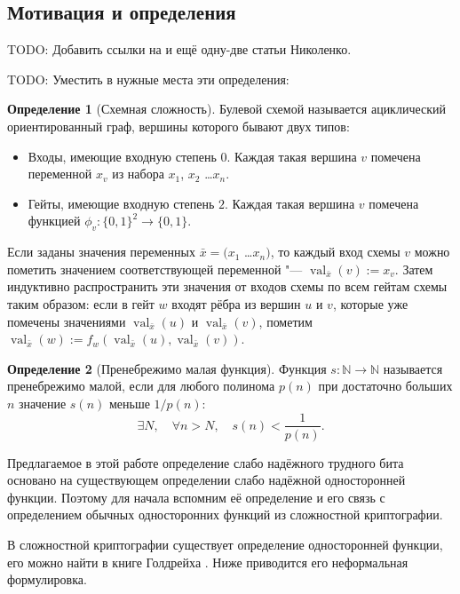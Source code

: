 \documentclass[oneside, a4paper]{article}
\theoremstyle{definition}
\newtheorem{definition}{Определение}
\theoremstyle{remark}
\DeclareMathOperator*{\val}{val}
\begin{document}
\subsection{Мотивация и определения}

TODO: Добавить ссылки на \cite{hirsch_milanich_nikolenko} и ещё одну-две статьи
Николенко.

TODO: Уместить в нужные места эти определения:

\begin{definition}[Схемная сложность]
Булевой схемой называется ациклический ориентированный граф, вершины которого
бывают двух типов:
\begin{itemize}
\item Входы, имеющие входную степень $0$. Каждая такая вершина $v$ помечена
  переменной $x_v$ из набора $x_1$, $x_2$ \dots $x_n$.
\item Гейты, имеющие входную степень $2$. Каждая такая вершина $v$ помечена
  функцией $\phi_v : \{0, 1\}^2 \to \{0, 1\}$.
\end{itemize}

Если заданы значения переменных $\bar{x} = (x_1$ \dots $x_n)$, то каждый вход
схемы $v$ можно пометить значением соответствующей переменной "--- $\val_{\bar
x}(v) := x_v$. Затем индуктивно распространить эти значения от входов схемы по
всем гейтам схемы таким образом: если в гейт $w$ входят рёбра из вершин $u$ и
$v$, которые уже помечены значениями $\val_{\bar x}(u)$ и $\val_{\bar x}(v)$,
пометим $\val_{\bar x}(w) := f_w(\val_{\bar x}(u), \val_{\bar x}(v))$.

\end{definition}

\begin{definition}[Пренебрежимо малая функция]
Функция $s : \mathbb N \to \mathbb N$ называется пренебрежимо малой, если для
любого полинома $p(n)$ при достаточно больших $n$ значение $s(n)$ меньше $1 /
p(n)$:
\[
\exists N,\quad \forall n > N,\quad s(n) < \frac 1 {p(n)}.
\]
\end{definition}

Предлагаемое в этой работе определение слабо надёжного трудного бита основано
на существующем определении слабо надёжной односторонней функции. Поэтому для
начала вспомним её определение и его связь с определением обычных односторонних
функций из сложностной криптографии.

В сложностной криптографии существует определение односторонней функции, его
можно найти в книге Голдрейха \cite{goldreich}. Ниже приводится его неформальная
формулировка.
\end{document}
